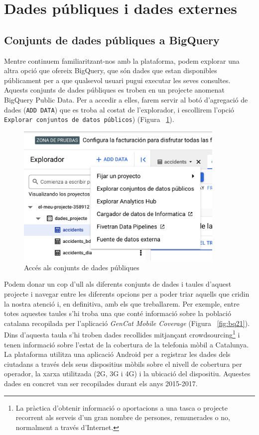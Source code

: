 \documentclass[11pt,longbibliography]{article}
\theoremstyle{definition}
\theoremstyle{remark}
\begin{document}
\newpage

\section{Dades públiques i dades externes}

\subsection{Conjunts de dades públiques a BigQuery}

Mentre continuem familiaritzant-nos amb la plataforma, podem explorar una altra opció que ofereix BigQuery, que són dades que estan disponibles públicament per a que qualsevol usuari pugui executar les seves consultes. Aquests conjunts de dades públiques es troben en un projecte anomenat BigQuery Public Data. Per a accedir a elles, farem servir al botó d'agregació de dades (\verb|ADD DATA|) que es troba al costat de l'explorador, i escollirem l'opció \verb|Explorar conjuntos de datos públicos|) (Figura ~\ref{fig:bq20}).


\begin{figure}[h!]
\begin{center}
\includegraphics[width=10cm]{bq20}
\end{center}
\caption{Accés als conjunts de dades públiques}
\label{fig:bq20}
\end{figure}


Podem donar un cop d'ull als diferents conjunts de dades i taules d'aquest projecte i navegar entre les diferents opcions per a poder triar aquells que cridin la nostra atenció i, en definitiva, amb els que treballarem. Per exemple, entre totes aquestes taules s'hi troba una que conté informació sobre la població catalana recopilada per l'aplicació \textit{GenCat Mobile Coverage} (Figura ~\ref{fig:bq21}). Dins d'aquesta taula s'hi troben dades recollides mitjançant crowdsourcing\footnote[1]{La pràctica d'obtenir informació o aportacions a una tasca o projecte recorrent als serveis d'un gran nombre de persones, remunerades o no, normalment a través d'Internet.} i tenen informació sobre l'estat de la cobertura de la telefonia mòbil a Catalunya. La plataforma utilitza una aplicació Android per a registrar les dades dels ciutadans a través dels seus dispositius mòbils sobre el nivell de cobertura per operador, la xarxa utilitzada (2G, 3G i 4G) i la ubicació del dispositiu. Aquestes dades en concret van ser recopilades durant els anys 2015-2017.
\end{document}
